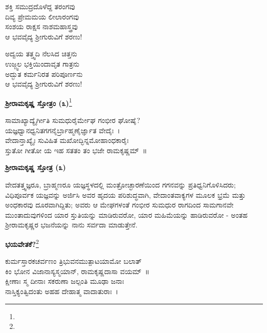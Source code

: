 \begin{myquote}
ಶಕ್ತಿ ಸಮುದ್ರದೊಳೆದ್ದ ತರಂಗವು\\ದಿವ್ಯ ಪ್ರೇಮಮಯ ಲೀಲಾರಂಗವು\\ಸಂಶಯ ರಾಕ್ಷಸ ನಾಶಮಹಾಸ್ತ್ರವು\\ಆ ಭವವೈದ್ಯ ಶ‍್ರೀಗುರುವಿಗೆ ಶರಣು!
\end{myquote}

\begin{myquote}
ಅದ್ವಯ ತತ್ತ್ವದಿ ನೆಲಸಿದ ಚಿತ್ತನು\\ಉಜ್ಜ್ವಲ ಭಕ್ತಿಯಿಂದಾವೃತ ಗಾತ್ರನು\\ಅದ್ಭುತ ಕರ್ಮನಿರತ ಪರಿಪೂರ್ಣನು\\ಆ ಭವವೈದ್ಯ ಶ‍್ರೀಗುರುವಿಗೆ ಶರಣು!
\end{myquote}

\begin{center}
\textbf{ಶ‍್ರೀರಾಮಕೃಷ್ಣ ಸ್ತೋತ್ರಂ (೩)}\footnote{}
\end{center}

\begin{myquote}
ಸಾಮಾಖ್ಯಾದ್ಯೈರ್ಗೀತಿ ಸುಮಧುರೈರ್ಮೇಘ ಗಂಭೀರ ಘೋಷೈ?\\ಯಜ್ಞಧ್ವಾನಧ್ವನಿತಗಗನೈರ್ಬ್ರಾಹ್ಮಣೈರ್ಜ್ಞಾತ ವೇದೈಃ~।\\ವೇದಾನ್ತಾಖ್ಯೈಃ ಸುವಿಹಿತ ಮಖೋದ್ಭಿನ್ನಮೋಹಾಂಧಕಾರೈಃ\\ಸ್ತುತೋ ಗೀತೋ ಯ ಇಹ ಸತತಂ ತಂ ಭಜೇ ರಾಮಕೃಷ್ಣಮ್~॥
\end{myquote}

\begin{center}
\textbf{ಶ‍್ರೀರಾಮಕೃಷ್ಣ ಸ್ತೋತ್ರ (೩)}
\end{center}

ವೇದತತ್ತ್ವಜ್ಞರೂ, ಬ್ರಾಹ್ಮಣರೂ ಯಜ್ಞಸ್ಥಳದಲ್ಲಿ ಮಂತ್ರೋಚ್ಛಾರಣೆಯಿಂದ ಗಗನವನ್ನು ಪ್ರತಿಧ್ವನಿಗೊಳಿಸಿದರು; ವಿಧಿಪೂರ್ವಕ ಯಜ್ಞವನ್ನು ಅರ್ಜಿಸಿ ಅವರ ಹೃದಯ ಪರಿಶುದ್ಧವಾಗಿ, ವೇದಾಂತವಾಕ್ಯಗಳ ಮೂಲಕ ಭ್ರಮೆ ಮತ್ತು ಅಂಧಕಾರವು ದೂರವಾಗಿದ್ದಿತು; ಅವರು ಆ ಮೇಘಗಳಂತೆ ಗಂಭೀರ ಸುಮಧುರ ರಾಗದಿಂದ ಸಾಮಗಾನವೇ ಮುಂತಾದುವುಗಳಿಂದ ಯಾರ ಸ್ತುತಿಯನ್ನು ಮಾಡಿರುವರೋ, ಯಾರ ಮಹಿಮೆಯನ್ನು ಹಾಡಿರುವರೋ - ಅಂತಹ ಶ‍್ರೀರಾಮಕೃಷ್ಣರ ಭಜನೆಯನ್ನು ನಾನು ಸರ್ವದಾ ಮಾಡುತ್ತೇನೆ.

\begin{center}
\textbf{ಭಯವೇತಕೆ?}\footnote{}
\end{center}

\begin{myquote}
ಕುರ್ಮಸ್ತಾರಕಚರ್ವಣಂ ತ್ರಿಭುವನಮುತ್ಪಾಟಯಾಮೋ ಬಲಾತ್\\ಕಿಂ ಭೋನ ವಿಜಾನಾಸ್ಯಸ್ಮಯಾನ್, ರಾಮಕೃಷ್ಣದಾಸಾ ವಯಮ್~॥\\ಕ್ಷೀಣಾಃ ಸ್ಮ ದೀನಾಃ ಸಕರುಣಾ ಜಲ್ಪಂತಿ ಮೂಢಾ ಜನಾಃ\\ನಾಸ್ತಿಕ್ಯಂತ್ವಿದಂತು ಅಹಹ ದೇಹಾತ್ಮ ವಾದಾತುರಾಃ~।
\end{myquote}

